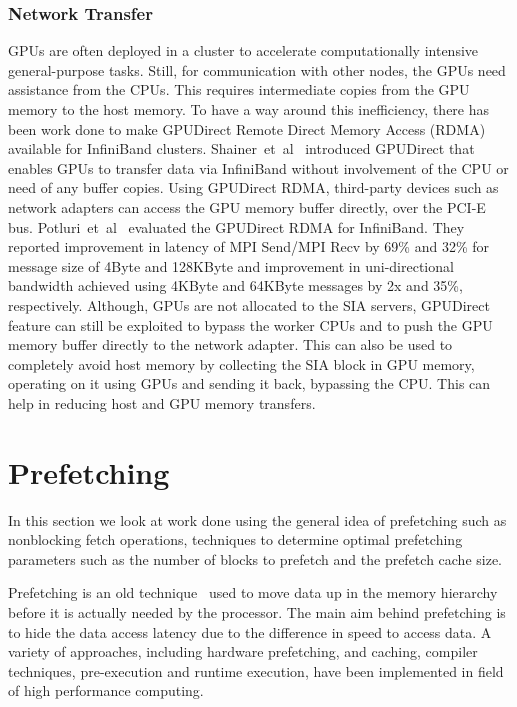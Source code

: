 \subsubsection{Network Transfer}
GPUs are often deployed in a cluster to accelerate computationally intensive
general-purpose tasks. Still, for communication with other nodes, the GPUs need assistance from the CPUs.
This requires intermediate copies from the GPU memory to the host memory. To have
a way around this inefficiency, there has been work done to make GPUDirect Remote
Direct Memory Access (RDMA) available for InfiniBand clusters. Shainer~et~al~\cite{Shainer2011} introduced
GPUDirect that enables GPUs to transfer data via InfiniBand without involvement
of the CPU or need of any buffer copies. Using GPUDirect RDMA, third-party devices such as
network adapters can access the GPU memory buffer directly, over the PCI-E bus.
Potluri~et~al~\cite{Potluri:2013:EIM:2570457.2571010} evaluated the GPUDirect RDMA for InfiniBand. They reported
improvement in latency of MPI Send/MPI Recv by 69\% and 32\% for message size of
4Byte and 128KByte and improvement in uni-directional bandwidth achieved using
4KByte and 64KByte messages by 2x and 35\%, respectively.
Although, GPUs are not allocated to the SIA servers, GPUDirect feature can still
be exploited to bypass the worker CPUs and to push the GPU memory buffer directly to the network
adapter. This can also be used to completely avoid host memory by collecting the
SIA block in GPU memory, operating on it using GPUs and sending it back, bypassing
the CPU. This can help in reducing host and GPU memory transfers.

\section{Prefetching}
In this section we look at work done using the general idea of prefetching such as
nonblocking fetch operations, techniques to determine optimal prefetching
parameters such as the number of blocks to prefetch and the prefetch cache size.

Prefetching is an old technique~\cite{anacker68, Smith1982, Vanderwiel2000}
used to move data up in the memory hierarchy before it is actually needed by the processor.
The main aim behind prefetching is to hide the data access latency due to the difference in speed to access
data. A variety of approaches, including hardware prefetching, and caching, compiler
techniques, pre-execution and runtime execution, have been implemented in field of
high performance computing.

